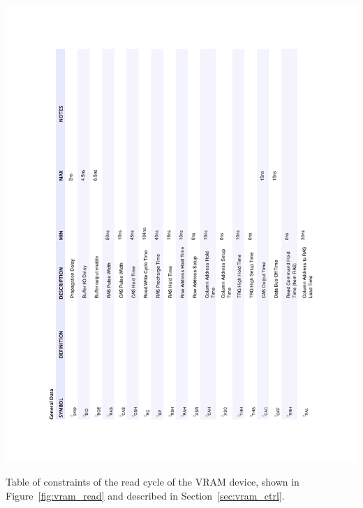 \documentclass[titlepage]{scrartcl}
\begin{document}
	\begin{table}[h!]
	\vspace{-2cm}
	\centerline{\includegraphics[width=20cm]{img/vram_read_table.pdf}}
		\vspace{0cm}
                	\caption{Table of constraints of the read cycle of the VRAM device, shown in Figure~\ref{fig:vram_read} and described in Section~\ref{sec:vram_ctrl}.}
               	\label{tab:vram_read}
	\end{table}

	\clearpage

	

	\clearpage
\end{document}
